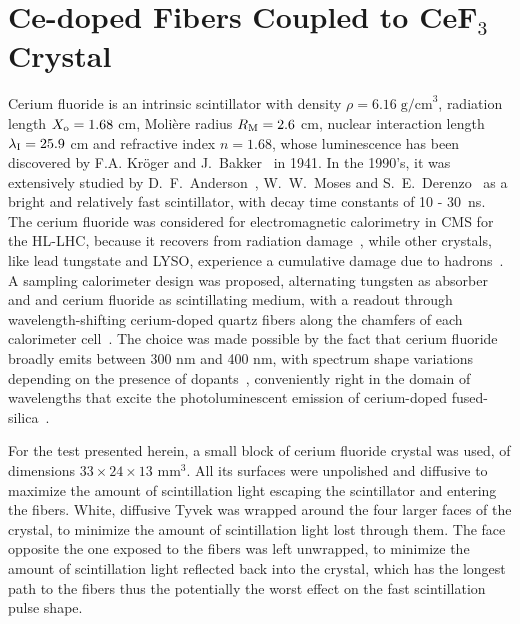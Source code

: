 \documentclass[a4paper,11pt]{article}
\begin{document}
\section{Ce-doped Fibers Coupled to CeF\texorpdfstring{$_3$}{} Crystal}
\label{sec:WLS}
Cerium fluoride is an intrinsic scintillator with density $\rho=6.16\; {\mathrm{g/cm}}^3$, radiation length $X_{\rm o} = 1.68$ cm, Moli\`ere radius $R_{\rm M} = 2.6$ cm, nuclear interaction length $\lambda_{\rm I} = 25.9$ cm and refractive index $n = 1.68$, whose luminescence has been discovered by F.A. Kr\"oger and J.~Bakker~\cite{r-KRO} in 1941. In the 1990's, it was extensively studied by D.~F.~Anderson~\cite{r-AND}, W.~W.~Moses and S.~E.~Derenzo~\cite{r-MOS} as a bright and relatively fast scintillator, with decay time constants of 10 - 30~ns. 
The cerium fluoride was considered for electromagnetic calorimetry in CMS for the HL-LHC, because it recovers from radiation damage~\cite{r-NIMCEF3}, while other crystals, like lead tungstate and LYSO, experience a cumulative damage due to hadrons~\cite{r-FISSNIM, r-NIMLYSO}. A sampling calorimeter design was proposed, alternating tungsten as absorber and and cerium fluoride as scintillating medium, with a readout through wavelength-shifting cerium-doped quartz fibers along the chamfers of each calorimeter cell~\cite{r-CALORCEF3, r-WCEF3FRA, r-WCEF3H4}. The choice was made possible by the fact that cerium fluoride broadly emits between 300 nm and 400 nm, with spectrum shape variations depending on the presence of dopants~\cite{r-EACEF3}, conveniently right in the domain of wavelengths that excite the photoluminescent emission of cerium-doped fused-silica~\cite{r-TTU,r-vedda}.

For the test presented herein, a small block of cerium fluoride crystal was used, of dimensions $33\times 24 \times13$ mm$^3$. All its surfaces were unpolished and diffusive to maximize the amount of scintillation light escaping the scintillator and entering the fibers. White, diffusive Tyvek was wrapped around the four larger faces of the crystal, to minimize the amount of scintillation light lost through them. The face opposite the one exposed to the fibers was left unwrapped, to minimize the amount of scintillation light reflected back into the crystal, which has the longest path to the fibers thus the potentially the worst effect on the fast scintillation pulse shape.
\end{document}
